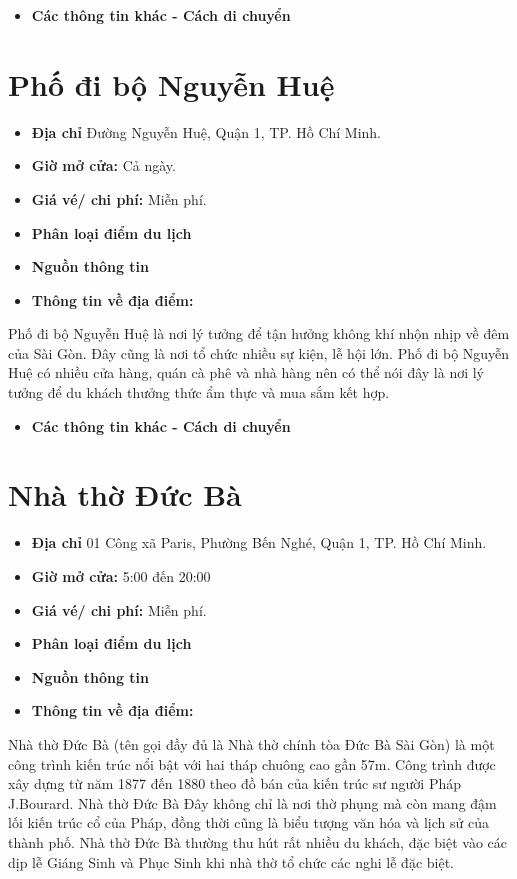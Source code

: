 \documentclass{article}
\begin{document}
\begin{itemize}
    \item{\textbf{Các thông tin khác - Cách di chuyển}}
\end{itemize}

\section{Phố đi bộ Nguyễn Huệ}
\begin{itemize}
    \item{\textbf{Địa chỉ}} Đường Nguyễn Huệ, Quận 1, TP. Hồ Chí Minh.
    \item{\textbf{Giờ mở cửa:}} Cả ngày.
    \item{\textbf{Giá vé/ chi phí:}} Miễn phí.
    \item{\textbf{Phân loại điểm du lịch} }
    \item{\textbf{Nguồn thông tin}}
    \item{\textbf{Thông tin về địa điểm:}}
\end{itemize}
Phố đi bộ Nguyễn Huệ là nơi lý tưởng để tận hưởng không khí nhộn nhịp về đêm của Sài Gòn. Đây cũng là nơi tổ chức nhiều sự kiện, lễ hội lớn. Phố đi bộ Nguyễn Huệ có nhiều cửa hàng, quán cà phê và nhà hàng nên có thể nói đây là nơi lý tưởng để du khách thưởng thức ẩm thực và mua sắm kết hợp.

\begin{itemize}
    \item{\textbf{Các thông tin khác - Cách di chuyển}}
\end{itemize}

\section{Nhà thờ Đức Bà}
\begin{itemize}
    \item{\textbf{Địa chỉ}} 01 Công xã Paris, Phường Bến Nghé, Quận 1, TP. Hồ Chí Minh.
    \item{\textbf{Giờ mở cửa:}} 5:00 đến 20:00
    \item{\textbf{Giá vé/ chi phí:}} Miễn phí.
    \item{\textbf{Phân loại điểm du lịch} }
    \item{\textbf{Nguồn thông tin}}
    \item{\textbf{Thông tin về địa điểm:}}
\end{itemize}
Nhà thờ Đức Bà (tên gọi đầy đủ là Nhà thờ chính tòa Đức Bà Sài Gòn) là một công trình kiến trúc nổi bật với hai tháp chuông cao gần 57m. Công trình được xây dựng từ năm 1877 đến 1880 theo đồ bán của kiến trúc sư người Pháp J.Bourard. Nhà thờ Đức Bà Đây không chỉ là nơi thờ phụng mà còn mang đậm lối kiến trúc cổ của Pháp, đồng thời cũng là biểu tượng văn hóa và lịch sử của thành phố. Nhà thờ Đức Bà thường thu hút rất nhiều du khách, đặc biệt vào các dịp lễ Giáng Sinh và Phục Sinh khi nhà thờ tổ chức các nghi lễ đặc biệt.
\end{document}
